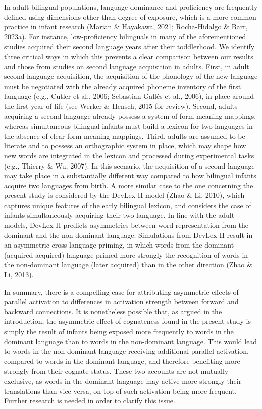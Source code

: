 \documentclass[
  12pt,
  b5paperpaper,
  twoside]{scrreprt}
\begin{document}
In adult bilingual populations, language dominance and proficiency are
frequently defined using dimensions other than degree of exposure, which
is a more common practice in infant research (Marian \& Hayakawa, 2021;
Rocha-Hidalgo \& Barr, 2023a). For instance, low-proficiency bilinguals
in many of the aforementioned studies acquired their second language
years after their toddlerhood. We identify three critical ways in which
this prevents a clear comparison between our results and those from
studies on second language acquisition in adults. First, in adult second
language acquisition, the acquisition of the phonology of the new
language must be negotiated with the already acquired phoneme inventory
of the first language (e.g., Cutler et al., 2006; Sebastian-Gallés et
al., 2006), in place around the first year of life (see Werker \&
Hensch, 2015 for review). Second, adults acquiring a second language
already possess a system of form-meaning mappings, whereas simultaneous
bilingual infants must build a lexicon for two languages in the absence
of clear form-meaning mappings. Third, adults are assumed to be literate
and to possess an orthographic system in place, which may shape how new
words are integrated in the lexicon and processed during experimental
tasks (e.g., Thierry \& Wu, 2007). In this scenario, the acquisition of
a second language may take place in a substantially different way
compared to how bilingual infants acquire two languages from birth. A
more similar case to the one concerning the present study is considered
by the DevLex-II model (Zhao \& Li, 2010), which captures unique
features of the early bilingual lexicon, and considers the case of
infants simultaneously acquiring their two language. In line with the
adult models, DevLex-II predicts asymmetries between word representation
from the dominant and the non-dominant language. Simulations from
DevLex-II result in an asymmetric cross-language priming, in which words
from the dominant (acquired acquired) language primed more strongly the
recognition of words in the non-dominant language (later acquired) than
in the other direction (Zhao \& Li, 2013).

In summary, there is a compelling case for attributing asymmetric
effects of parallel activation to differences in activation strength
between forward and backward connections. It is nonetheless possible
that, as argued in the introduction, the asymmetric effect of
cognateness found in the present study is simply the result of infants
being exposed more frequently to words in the dominant language than to
words in the non-dominant language. This would lead to words in the
non-dominant language receiving additional parallel activation, compared
to words in the dominant language, and therefore benefiting more
strongly from their cognate status. These two accounts are not mutually
exclusive, as words in the dominant language may active more strongly
their translations than vice versa, on top of such activation being more
frequent. Further research is needed in order to clarify this issue.
\end{document}
